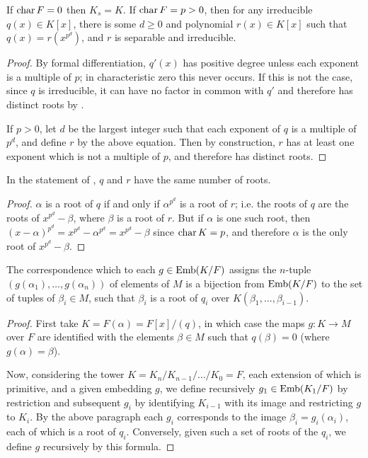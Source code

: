 \begin{lemma} If $\operatorname{\text{char}}{F} = 0$ then $K_s = K$.  If $\operatorname{\text{char}}{F} = p > 0$, then for
any irreducible $q(x) \in K[x]$, there is some $d \geq 0$ and polynomial $r(x)
\in K[x]$ such that $q(x) = r(x^{p^d})$, and $r$ is separable and irreducible.
\label{sep_poly}
\end{lemma}

\begin{proof} By formal differentiation, $q'(x)$ has positive degree unless
each exponent is a multiple of $p$; in characteristic zero this never occurs.
If this is not the case, since $q$ is irreducible, it can have no factor in
common with $q'$ and therefore has distinct roots by .

If $p > 0$, let $d$ be the largest integer such that each exponent of $q$ is a
multiple of $p^d$, and define $r$ by the above equation.  Then by
construction, $r$ has at least one exponent which is not a multiple of $p$,
and therefore has distinct roots. \end{proof}

\begin{corollary} In the statement of , $q$ and $r$ have the same
number of roots.
\label{sep_roots}
\end{corollary}

\begin{proof} $\alpha$ is a root of $q$ if and only if $\alpha^{p^d}$ is a
root of $r$; i.e. the roots of $q$ are the roots of $x^{p^d} - \beta$, where
$\beta$ is a root of $r$.  But if $\alpha$ is one such root, then $(x -
\alpha)^{p^d} = x^{p^d} - \alpha^{p^d} = x^{p^d} - \beta$ since $\operatorname{\text{char}}{K} =
p$, and therefore $\alpha$ is the only root of $x^{p^d} - \beta$. \end{proof}

\begin{lemma} The correspondence which to each $g \in \operatorname{\text{Emb}}(K/F)$ assigns the
$n$-tuple $(g(\alpha_1), \dots, g(\alpha_n))$ of elements of $M$ is a
bijection from $\operatorname{\text{Emb}}(K/F)$ to the set of tuples of $\beta_i \in M$, such that
$\beta_i$ is a root of $q_i$ over $K(\beta_1, \dots, \beta_{i - 1})$.
\label{emb_roots}
\end{lemma}

\begin{proof} First take $K = F(\alpha) = F[x]/(q)$, in which case the maps $g
\colon K \to M$ over $F$ are identified with the elements $\beta \in M$ such
that $q(\beta) = 0$ (where $g(\alpha) = \beta$).

Now, considering the tower $K = K_n / K_{n - 1} / \dots / K_0 = F$, each
extension of which is primitive, and a given embedding $g$, we define
recursively $g_1 \in \operatorname{\text{Emb}}(K_1/F)$ by restriction and subsequent $g_i$ by
identifying $K_{i - 1}$ with its image and restricting $g$ to $K_i$.  By the
above paragraph each $g_i$ corresponds to the image $\beta_i = g_i(\alpha_i)$,
each of which is a root of $q_i$.  Conversely, given such a set of roots of
the $q_i$, we define $g$ recursively by this formula. \end{proof}

